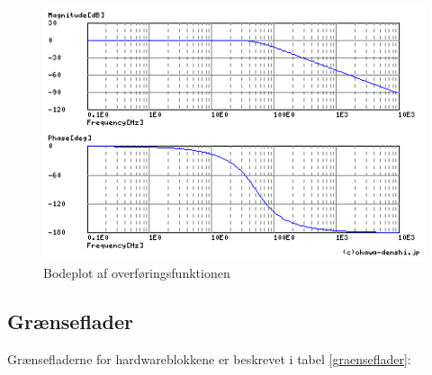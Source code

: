 \begin{figure}[H]
	\centering
	\includegraphics[width=1\textwidth]{Figurer/Hardware/Bodeplot}
	\caption{Bodeplot af overføringsfunktionen}
	\label{fig:Bodeplot}
\end{figure}



\subsection{Grænseflader}
Grænsefladerne for hardwareblokkene er beskrevet i tabel \ref{graenseflader}:

